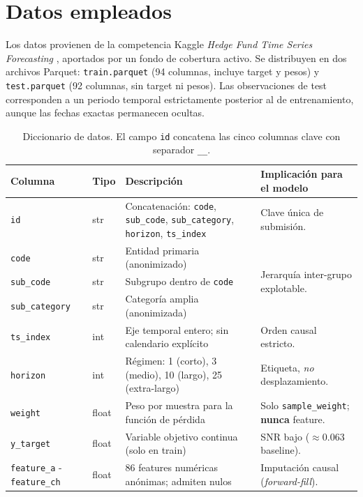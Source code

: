 \documentclass{article}
\begin{document}

\section{Datos empleados}

Los datos provienen de la competencia Kaggle \emph{Hedge Fund Time Series Forecasting} \citep{adatacompany2026}, aportados por un fondo de cobertura activo. Se distribuyen en dos archivos Parquet: \texttt{train.parquet} (94 columnas, incluye target y pesos) y \texttt{test.parquet} (92 columnas, sin target ni pesos). Las observaciones de test corresponden a un periodo temporal estrictamente posterior al de entrenamiento, aunque las fechas exactas permanecen ocultas.

\begin{table}[h!]
  \caption{Diccionario de datos. El campo \texttt{id} concatena las cinco columnas clave con separador \texttt{\_\_}.}
  \label{tab:datos}
  \centering
  \begin{tabular}{llp{4.8cm}p{3.0cm}}
    \toprule
    Columna & Tipo & Descripción & Implicación para el modelo \\
    \midrule
    \texttt{id}            & str   & Concatenación: \texttt{code}, \texttt{sub\_code}, \texttt{sub\_category}, \texttt{horizon}, \texttt{ts\_index} & Clave única de submisión. \\
    \texttt{code}          & str   & Entidad primaria (anonimizado) & \multirow{3}{3cm}{Jerarquía inter-grupo explotable.} \\
    \texttt{sub\_code}     & str   & Subgrupo dentro de \texttt{code} & \\
    \texttt{sub\_category} & str   & Categoría amplia (anonimizada) & \\
    \texttt{ts\_index}     & int   & Eje temporal entero; sin calendario explícito & Orden causal estricto. \\
    \texttt{horizon}       & int   & Régimen: 1 (corto), 3 (medio), 10 (largo), 25 (extra-largo) & Etiqueta, \emph{no} desplazamiento. \\
    \texttt{weight}        & float & Peso por muestra para la función de pérdida & Solo \texttt{sample\_weight}; \textbf{nunca} feature. \\
    \texttt{y\_target}     & float & Variable objetivo continua (solo en train) & SNR bajo (${\approx}0.063$ baseline). \\
    \texttt{feature\_a} - \texttt{feature\_ch} & float & 86 features numéricas anónimas; admiten nulos & Imputación causal (\emph{forward-fill}). \\
    \bottomrule
  \end{tabular}
\end{table}
\end{document}
